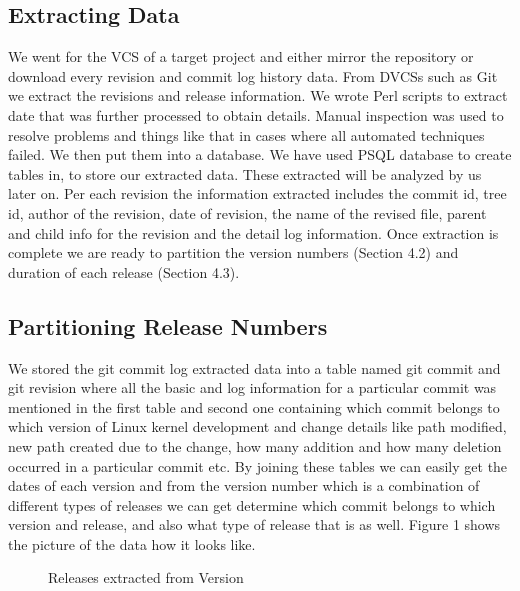 \documentclass{acm_proc_article-sp}
\begin{document}
\subsection{Extracting Data}
We went for the VCS of a target project and either mirror the repository or download every revision and commit log history data. From DVCSs such as Git we extract the revisions and release information. We wrote Perl scripts to extract date that was further processed to obtain details. Manual inspection was used to resolve problems and things like that in cases where all automated techniques failed.
We then put them into a database. We have used PSQL database to create tables in, to store our extracted data. These extracted will be analyzed by us later on. Per each revision the information extracted includes the commit id, tree id, author of the revision, date of revision, the name of the revised file, parent and child info for the revision and the detail log information. Once extraction is complete we are ready to partition the version numbers (Section 4.2) and duration  of each release (Section 4.3).

\subsection{Partitioning Release Numbers}
We stored the git commit log extracted data into a table named git commit and git revision where all the basic and log information for a particular commit was mentioned in the first table and second one containing which commit belongs to which version of Linux kernel development and change details like path modified, new path created due to the change, how many addition and how many deletion occurred in a particular commit etc. By joining these tables we can easily get the dates of each version and from the version number which is a combination of different types of releases we can get determine which commit belongs to which version and release, and also what type of release that is as well. Figure 1 shows the picture of the data how it looks like.
\begin{figure}
\centering
{}
\caption{Releases extracted from Version}
\end{figure}
\end{document}
